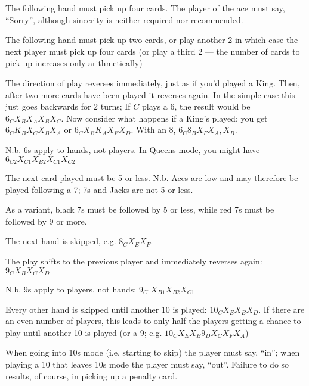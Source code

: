 \documentclass[12pt]{article}
\begin{document}
\begin{description}
\newcommand{\card}[1]{\hbox to 15mm{#1\hfil}}
\item[\card{Ace}]
  The following hand must pick up four cards.  The player of the ace must say, ``Sorry'', although sincerity is neither required nor recommended.

  \item[\card{2}]
    The following hand must pick up two cards, or play another 2 in which case the next player must
    pick up four cards (or play a third 2 --- the number of cards to pick up increases only arithmetically)

  \item[\card{6}]
    The direction of play reverses immediately, just as if you'd played a King.  Then, after two
    more cards have been played it reverses again.  In the simple case this just goes backwards
    for 2 turns; If $C$ plays
    a 6, the result would be $6_C X_B X_A X_B X_C$.  Now consider what happens if a
    King's played;  you get $6_C K_B X_C X_B X_A$ or $6_C X_B K_A X_E X_D$.  With an 8,
    $6_C 8_B X_F X_A, X_B$.

    N.b. 6s apply to hands, not players.  In Queens mode, you might have $6_{C2} X_{C1} X_{B2} X_{C1} X_{C2}$

  \item[\card{7}]
    The next card played must be 5 or less.  N.b. Aces are low and may therefore be played following a 7;
    7s and Jacks are not 5 or less.

    As a variant, black 7s must be followed by 5 or less, while red 7s must be followed by 9 or more.

  \item[\card{8}]
    The next hand is skipped, e.g. $8_C X_E X_F$.

  \item[\card{9}]
    The play shifts to the previous player and immediately reverses again: $9_C X_B X_C X_D$

    N.b. 9s apply to players, not hands: $9_{C1} X_{B1} X_{B2} X_{C1}$

  \item[\card{10}]
    Every other hand is skipped until another 10 is played: $10_C X_E X_B X_D$.  If there are an even number of
    players, this leads to only half the players getting a chance to play until another
    10 is played (or a 9; e.g.  $10_C X_E X_B 9_D X_C X_F X_A$)

    When going into 10s mode (i.e. starting to skip) the player must say, ``in''; when playing a
    10 that leaves 10s mode the player must say, ``out''.  Failure to do so results, of course,
    in picking up a penalty card.


\end{description}
\end{document}
